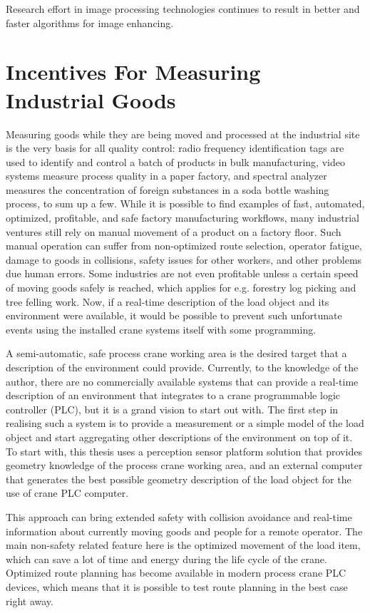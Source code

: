 \documentclass[12pt,a4paper,oneside,pdftex]{report}
\begin{document}
Research effort in image processing technologies continues to result in better and faster algorithms for image enhancing.

\section{Incentives For Measuring Industrial Goods}
\label{section:incentives_for_measuring_industrial_goods}

Measuring goods while they are being moved and processed at the industrial site is the very basis for all quality control: radio frequency identification tags are used to identify and control a batch of products in bulk manufacturing, video systems measure process quality in a paper factory, and spectral analyzer measures the concentration of foreign substances in a soda bottle washing process, to sum up a few. While it is possible to find examples of fast, automated, optimized, profitable, and safe factory manufacturing workflows, many industrial ventures still rely on manual movement of a product on a factory floor. Such manual operation can suffer from non-optimized route selection, operator fatigue, damage to goods in collisions, safety issues for other workers, and other problems due human errors. Some industries are not even profitable unless a certain speed of moving goods safely is reached, which applies for e.g. forestry log picking and tree felling work. Now, if a real-time description of the load object and its environment were available, it would be possible to prevent such unfortunate events using the installed crane systems itself with some programming.

A semi-automatic, safe process crane working area is the desired target that a description of the environment could provide. Currently, to the knowledge of the author, there are no commercially available systems that can provide a real-time description of an environment that integrates to a crane programmable logic controller (PLC), but it is a grand vision to start out with. The first step in realising such a system is to provide a measurement or a simple model of the load object and start aggregating other descriptions of the environment on top of it. To start with, this thesis uses a perception sensor platform solution that provides geometry knowledge of the process crane working area, and an external computer that generates the best possible geometry description of the load object for the use of crane PLC computer. 

This approach can bring extended safety with collision avoidance and real-time information about currently moving goods and people for a remote operator. The main non-safety related feature here is the optimized movement of the load item, which can save a lot of time and energy during the life cycle of the crane. Optimized route planning has become available in modern process crane PLC devices, which means that it is possible to test route planning in the best case right away.
\end{document}
